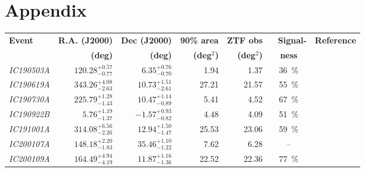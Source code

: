 \appendix
{} %
\chapter{Appendix}\label{appendix}
\def\arraystretch{1.5}
\begin{table*}
  \centering
  \small
  \begin{tabular}{l r r r r c c}
    \hline
    \textbf{Event}   & \textbf{R.A. (J2000)}    & \textbf{Dec (J2000)}     & \textbf{90\% area}   & \textbf{ZTF obs}     & ~ \textbf{Signal-} & \textbf{Reference}                                    \\
                     & \textbf{(deg)}           & \textbf{(deg)}           & \textbf{(deg$^{2}$)} & \textbf{(deg$^{2}$)} & \textbf{ness}      &                                                       \\
    \hline
    \hline
    \emph{IC190503A} & $120.28^{+0.57}_{-0.77}$ & $6.35^{+0.76}_{-0.70}$   & 1.94                 & 1.37                 & \SI{36}{\percent}  & \cite{IC190503A1, IC190503A2}                         \\
    \emph{IC190619A} & $343.26^{+4.08}_{-2.63}$ & $10.73^{+1.51}_{-2.61}$  & 27.21                & 21.57                & \SI{55}{\percent}  & \cite{IC190619A1, IC190619A2}                         \\
    \emph{IC190730A} & $225.79^{+1.28}_{-1.43}$ & $10.47^{+1.14}_{-0.89}$  & 5.41                 & 4.52                 & \SI{67}{\percent}  & \cite{IC190730A1, IC190730A2}                         \\
    \emph{IC190922B} & $5.76^{+1.19}_{-1.37}$   & $-1.57^{+0.93}_{-0.82}$  & 4.48                 & 4.09                 & \SI{51}{\percent}  & \cite{IC190922B1, IC190922B2, IC190922B3}             \\
    \emph{IC191001A} & $314.08^{+6.56}_{-2.26}$ & $12.94^{+1.50}_{-1.47}$  & 25.53                & 23.06                & \SI{59}{\percent}  & \cite{IC191001A1, IC191001A2, IC191001A3}             \\
    \emph{IC200107A} & $148.18^{+2.20}_{-1.83}$ & $35.46^{+1.10}_{-1.22}$  & 7.62                 & 6.28                 & --                 & \cite{IC200107A1, IC200107A2}                         \\
    \emph{IC200109A} & $164.49^{+4.94}_{-4.19}$ & $11.87^{+1.16}_{-1.36}$  & 22.52                & 22.36                & \SI{77}{\percent}  & \cite{IC200109A1, IC200109A2}                         \\

\end{tabular}
\end{table*}
